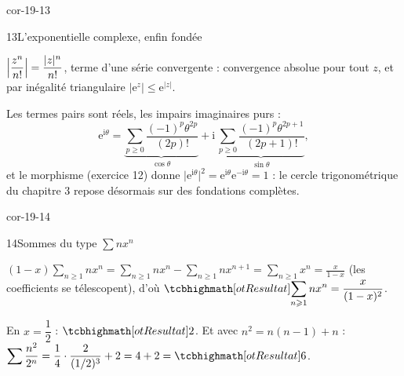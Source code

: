 \begin{blocLivre}{cor-19-13}
\begin{corrige}{13}{L'exponentielle complexe, enfin fondée}
\begin{questions}
  \item $\Bigl|\dfrac{z^{n}}{n!}\Bigr|=\dfrac{|z|^{n}}{n!}$, terme d'une
    série convergente : convergence absolue pour tout $z$, et par
    inégalité triangulaire
    $\bigl|\mathrm{e}^{z}\bigr|\leqslant\mathrm{e}^{|z|}$.
  \item Les termes pairs sont réels, les impairs imaginaires purs :
    \[
    \mathrm{e}^{\mathrm{i}\theta}
    =\underbrace{\sum_{p\geqslant0}\frac{(-1)^{p}\theta^{2p}}{(2p)!}}_{\cos\theta}
    +\mathrm{i}\,\underbrace{\sum_{p\geqslant0}
    \frac{(-1)^{p}\theta^{2p+1}}{(2p+1)!}}_{\sin\theta} ,
    \]
    et le morphisme (exercice 12) donne
    $\bigl|\mathrm{e}^{\mathrm{i}\theta}\bigr|^{2}
    =\mathrm{e}^{\mathrm{i}\theta}\mathrm{e}^{-\mathrm{i}\theta}=1$ : le
    cercle trigonométrique du chapitre 3 repose désormais sur des
    fondations complètes.
\end{questions}
\end{corrige}
\end{blocLivre}

\begin{blocLivre}{cor-19-14}
\begin{corrige}{14}{Sommes du type $\sum nx^{n}$}
\begin{questions}
  \item $(1-x)\displaystyle\sum_{n\geqslant1}nx^{n}
    =\sum_{n\geqslant1}nx^{n}-\sum_{n\geqslant1}nx^{n+1}
    =\sum_{n\geqslant1}x^{n}=\frac{x}{1-x}$ (les coefficients se
    télescopent), d'où
    $\res{\displaystyle\sum_{n\geqslant1}nx^{n}=\frac{x}{(1-x)^{2}}}$.
  \item En $x=\dfrac12$ : $\res{2}$. Et avec $n^{2}=n(n-1)+n$ :
    $\displaystyle\sum\frac{n^{2}}{2^{n}}
    =\frac14\cdot\frac{2}{(1/2)^{3}}+2=4+2=\res{6}$.
\end{questions}
\end{corrige}
\end{blocLivre}

